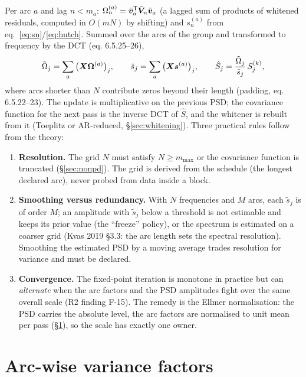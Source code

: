 Per arc $a$ and lag $n < m_a$: $\Omega_n^{(a)} = \bar{\bm{v}}_a^{\mathsf T}\tilde{\bm{V}}_n\bar{\bm{v}}_a$ (a lagged sum of products of whitened residuals, computed in $O(m N)$ by shifting) and $s_n^{(a)}$ from eq.~\eqref{eq:sn}/\eqref{eq:hutch}. Summed over the arcs of the group and transformed to frequency by the DCT (eq. 6.5.25--26),
\begin{equation}
\tilde\Omega_j = \sum_a \big(\bm{X}\bm{\Omega}^{(a)}\big)_j, \qquad
\tilde s_j = \sum_a \big(\bm{X}\bm{s}^{(a)}\big)_j, \qquad
\hat S_j = \frac{\tilde\Omega_j}{\tilde s_j}\, S_j^{(k)} ,
\label{eq:psdupdate}
\end{equation}
where arcs shorter than $N$ contribute zeros beyond their length (padding, eq. 6.5.22--23). The update is multiplicative on the previous PSD; the covariance function for the next pass is the inverse DCT of $\hat S$, and the whitener is rebuilt from it (Toeplitz or AR-reduced, \S\ref{sec:whitening}). Three practical rules follow from the theory:
\begin{enumerate}
\item \textbf{Resolution.} The grid $N$ must satisfy $N \ge m_{\max}$ or the covariance function is truncated (\S\ref{sec:nonpd}). The grid is derived from the schedule (the longest declared arc), never probed from data inside a  block.
\item \textbf{Smoothing versus redundancy.} With $N$ frequencies and $M$ arcs, each $\tilde s_j$ is of order $M$; an amplitude with $\tilde s_j$ below a threshold is not estimable and keeps its prior value (the ``freeze'' policy), or the spectrum is estimated on a coarser grid (Kvas 2019 §3.3: the arc length sets the spectral resolution). Smoothing the estimated PSD by a moving average trades resolution for variance and must be declared.
\item \textbf{Convergence.} The fixed-point iteration is monotone in practice but can \emph{alternate} when the arc factors and the PSD amplitudes fight over the same overall scale (R2 finding F-15). The remedy is the Ellmer normalisation: the PSD carries the absolute level, the arc factors are normalised to unit mean per pass (\S\ref{sec:arcfactors}), so the scale has exactly one owner.
\end{enumerate}

\section{Arc-wise variance factors}
\label{sec:arcfactors}


